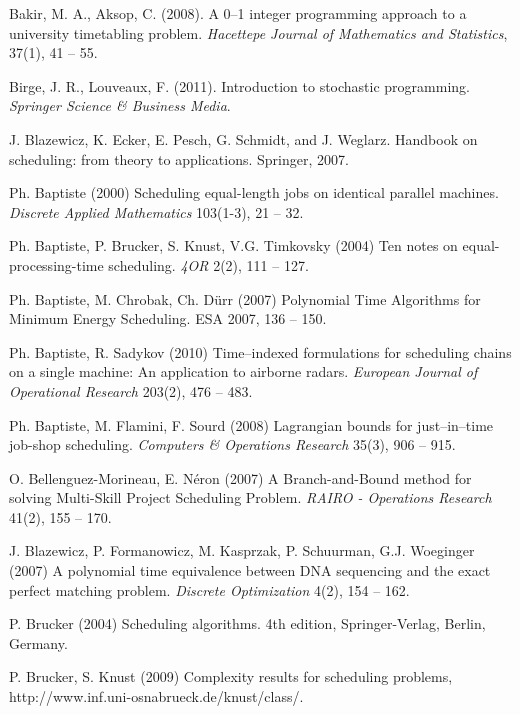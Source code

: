 \documentclass[11pt]{article}
\begin{document}
\begin{thebibliography}{19}
Bakir, M. A., Aksop, C. (2008). 
A 0--1 integer programming approach to a university timetabling problem. 
\textit{Hacettepe Journal of Mathematics and Statistics}, 37(1), 41 -- 55.

Birge, J. R., Louveaux, F. (2011). 
Introduction to stochastic programming. 
\textit{Springer Science \& Business Media}.

J. Blazewicz, K. Ecker, E. Pesch, G. Schmidt, and J. Weglarz. 
Handbook on scheduling: from theory to applications. Springer, 2007.

Ph. Baptiste (2000) 
Scheduling equal-length jobs on identical parallel machines. 
\textit{Discrete Applied Mathematics} 103(1-3), 21 -- 32.

Ph. Baptiste, P. Brucker, S. Knust, V.G. Timkovsky (2004) 
Ten notes on equal-processing-time scheduling. 
\textit{4OR} 2(2), 111 -- 127.

Ph. Baptiste, M. Chrobak, Ch. Dürr (2007) 
Polynomial Time Algorithms for Minimum Energy Scheduling. 
ESA 2007, 136 -- 150.

Ph. Baptiste, R. Sadykov (2010) 
Time--indexed formulations for scheduling chains on a single machine: An application to airborne radars. 
\textit{European Journal of Operational Research} 203(2), 476 -- 483.

Ph. Baptiste, M. Flamini, F. Sourd (2008) 
Lagrangian bounds for just--in--time job-shop scheduling. 
\textit{Computers \& Operations Research} 35(3), 906 -- 915.

O. Bellenguez-Morineau, E. Néron (2007) 
A Branch-and-Bound method for solving Multi-Skill Project Scheduling Problem. 
\textit{RAIRO - Operations Research} 41(2), 155 -- 170.

J. Blazewicz, P. Formanowicz, M. Kasprzak, P. Schuurman, G.J. Woeginger (2007) 
A polynomial time equivalence between DNA sequencing and the exact perfect matching problem. 
\textit{Discrete Optimization} 4(2), 154 -- 162.

P. Brucker (2004) 
Scheduling algorithms. 4th edition, Springer-Verlag, Berlin, Germany.

P. Brucker, S. Knust (2009) Complexity results for scheduling problems, http://www.inf.uni-osnabrueck.de/knust/class/. 


\end{thebibliography}
\end{document}
